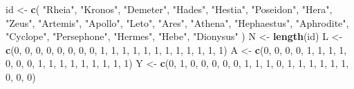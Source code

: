 \documentclass[
  10pt,
]{book}
\newenvironment{Shaded}{\begin{snugshade}}{\end{snugshade}}
\newcommand{\DecValTok}[1]{\textcolor[rgb]{0.00,0.00,0.81}{#1}}
\newcommand{\KeywordTok}[1]{\textcolor[rgb]{0.13,0.29,0.53}{\textbf{#1}}}
\newcommand{\NormalTok}[1]{#1}
\newcommand{\StringTok}[1]{\textcolor[rgb]{0.31,0.60,0.02}{#1}}
\begin{document}
\begin{Shaded}
\begin{Highlighting}[]
\NormalTok{id \textless{}{-}}\StringTok{ }\KeywordTok{c}\NormalTok{(}
  \StringTok{"Rheia"}\NormalTok{,}
  \StringTok{"Kronos"}\NormalTok{,}
  \StringTok{"Demeter"}\NormalTok{,}
  \StringTok{"Hades"}\NormalTok{,}
  \StringTok{"Hestia"}\NormalTok{,}
  \StringTok{"Poseidon"}\NormalTok{,}
  \StringTok{"Hera"}\NormalTok{,}
  \StringTok{"Zeus"}\NormalTok{,}
  \StringTok{"Artemis"}\NormalTok{,}
  \StringTok{"Apollo"}\NormalTok{,}
  \StringTok{"Leto"}\NormalTok{,}
  \StringTok{"Ares"}\NormalTok{,}
  \StringTok{"Athena"}\NormalTok{,}
  \StringTok{"Hephaestus"}\NormalTok{,}
  \StringTok{"Aphrodite"}\NormalTok{,}
  \StringTok{"Cyclope"}\NormalTok{,}
  \StringTok{"Persephone"}\NormalTok{,}
  \StringTok{"Hermes"}\NormalTok{,}
  \StringTok{"Hebe"}\NormalTok{,}
  \StringTok{"Dionysus"}
\NormalTok{)}
\NormalTok{N \textless{}{-}}\StringTok{ }\KeywordTok{length}\NormalTok{(id)}
\NormalTok{L \textless{}{-}}\StringTok{ }\KeywordTok{c}\NormalTok{(}\DecValTok{0}\NormalTok{, }\DecValTok{0}\NormalTok{, }\DecValTok{0}\NormalTok{, }\DecValTok{0}\NormalTok{, }\DecValTok{0}\NormalTok{, }\DecValTok{0}\NormalTok{, }\DecValTok{0}\NormalTok{, }\DecValTok{0}\NormalTok{, }\DecValTok{1}\NormalTok{, }\DecValTok{1}\NormalTok{, }\DecValTok{1}\NormalTok{, }\DecValTok{1}\NormalTok{, }\DecValTok{1}\NormalTok{, }\DecValTok{1}\NormalTok{, }\DecValTok{1}\NormalTok{, }\DecValTok{1}\NormalTok{, }\DecValTok{1}\NormalTok{, }\DecValTok{1}\NormalTok{, }\DecValTok{1}\NormalTok{, }\DecValTok{1}\NormalTok{)}
\NormalTok{A \textless{}{-}}\StringTok{ }\KeywordTok{c}\NormalTok{(}\DecValTok{0}\NormalTok{, }\DecValTok{0}\NormalTok{, }\DecValTok{0}\NormalTok{, }\DecValTok{0}\NormalTok{, }\DecValTok{1}\NormalTok{, }\DecValTok{1}\NormalTok{, }\DecValTok{1}\NormalTok{, }\DecValTok{1}\NormalTok{, }\DecValTok{0}\NormalTok{, }\DecValTok{0}\NormalTok{, }\DecValTok{0}\NormalTok{, }\DecValTok{1}\NormalTok{, }\DecValTok{1}\NormalTok{, }\DecValTok{1}\NormalTok{, }\DecValTok{1}\NormalTok{, }\DecValTok{1}\NormalTok{, }\DecValTok{1}\NormalTok{, }\DecValTok{1}\NormalTok{, }\DecValTok{1}\NormalTok{, }\DecValTok{1}\NormalTok{)}
\NormalTok{Y \textless{}{-}}\StringTok{ }\KeywordTok{c}\NormalTok{(}\DecValTok{0}\NormalTok{, }\DecValTok{1}\NormalTok{, }\DecValTok{0}\NormalTok{, }\DecValTok{0}\NormalTok{, }\DecValTok{0}\NormalTok{, }\DecValTok{0}\NormalTok{, }\DecValTok{0}\NormalTok{, }\DecValTok{1}\NormalTok{, }\DecValTok{1}\NormalTok{, }\DecValTok{1}\NormalTok{, }\DecValTok{0}\NormalTok{, }\DecValTok{1}\NormalTok{, }\DecValTok{1}\NormalTok{, }\DecValTok{1}\NormalTok{, }\DecValTok{1}\NormalTok{, }\DecValTok{1}\NormalTok{, }\DecValTok{1}\NormalTok{, }\DecValTok{0}\NormalTok{, }\DecValTok{0}\NormalTok{, }\DecValTok{0}\NormalTok{)}

\end{Highlighting}
\end{Shaded}
\end{document}
